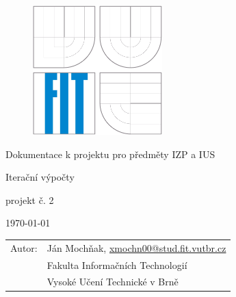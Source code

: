 \begin{titlepage}

\begin{figure}[!h]
  \centering
  \includegraphics[height=5cm]{img/logo}
\end{figure}

\vfill

\begin{center}
\begin{Large}
Dokumentace k projektu pro předměty IZP a IUS\\
\end{Large}
\bigskip
\begin{Huge}
Iterační výpočty\\
\end{Huge}
\smallskip
\begin{large}
projekt č. 2
\end{large}
\end{center}

\vfill

\begin{center}
\begin{Large}
\today
\end{Large}
\end{center}

\vfill

\begin{flushleft}
\begin{large}
\begin{tabular}{ll}
Autor: & Ján Mochňak, \url{xmochn00@stud.fit.vutbr.cz} \\
 & Fakulta Informačních Technologií \\
 & Vysoké Učení Technické v Brně \\
\end{tabular}
\end{large}
\end{flushleft}
\end{titlepage}
